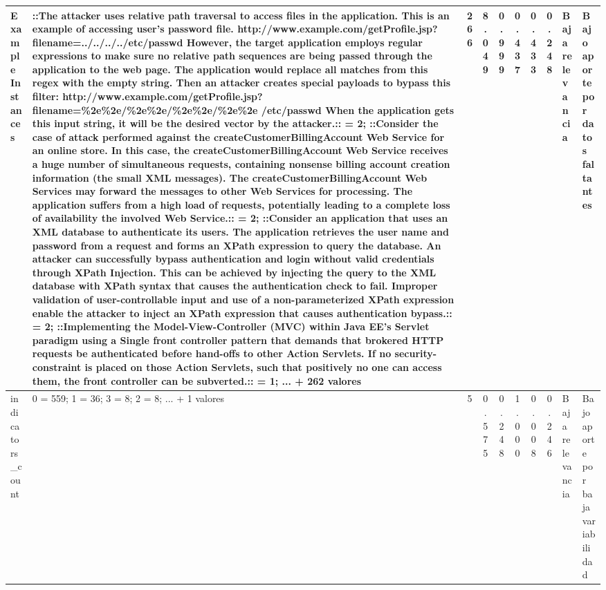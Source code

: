 \begin{table}[h]
\begin{tabular}{|p{2.1cm}|p{3.0cm}|c|c|c|c|c|c|p{2.5cm}|p{2.8cm}|}
\hline
Example Instances & ::The attacker uses relative path traversal to access files in the application. This is an example of accessing user's password file. http://www.example.com/getProfile.jsp?filename=../../../../etc/passwd However, the target application employs regular expressions to make sure no relative path sequences are being passed through the application to the web page. The application would replace all matches from this regex with the empty string. Then an attacker creates special payloads to bypass this filter: http://www.example.com/getProfile.jsp?filename=\%2e\%2e/\%2e\%2e/\%2e\%2e/\%2e\%2e /etc/passwd When the application gets this input string, it will be the desired vector by the attacker.:: = 2; ::Consider the case of attack performed against the createCustomerBillingAccount Web Service for an online store. In this case, the createCustomerBillingAccount Web Service receives a huge number of simultaneous requests, containing nonsense billing account creation information (the small XML messages). The createCustomerBillingAccount Web Services may forward the messages to other Web Services for processing. The application suffers from a high load of requests, potentially leading to a complete loss of availability the involved Web Service.:: = 2; ::Consider an application that uses an XML database to authenticate its users. The application retrieves the user name and password from a request and forms an XPath expression to query the database. An attacker can successfully bypass authentication and login without valid credentials through XPath Injection. This can be achieved by injecting the query to the XML database with XPath syntax that causes the authentication check to fail. Improper validation of user-controllable input and use of a non-parameterized XPath expression enable the attacker to inject an XPath expression that causes authentication bypass.:: = 2; ::Implementing the Model-View-Controller (MVC) within Java EE's Servlet paradigm using a Single front controller pattern that demands that brokered HTTP requests be authenticated before hand-offs to other Action Servlets. If no security-constraint is placed on those Action Servlets, such that positively no one can access them, the front controller can be subverted.:: = 1; ... + 262 valores & 266 & 8.049 & 0.999 & 0.437 & 0.433 & 0.248 & Baja relevancia & Bajo aporte por datos faltantes \\
\hline
indicators\_count & 0 = 559; 1 = 36; 3 = 8; 2 = 8; ... + 1 valores & 5 & 0.575 & 0.248 & 1.000 & 0.008 & 0.246 & Baja relevancia & Bajo aporte por baja variabilidad \\

\end{tabular}
\end{table}
